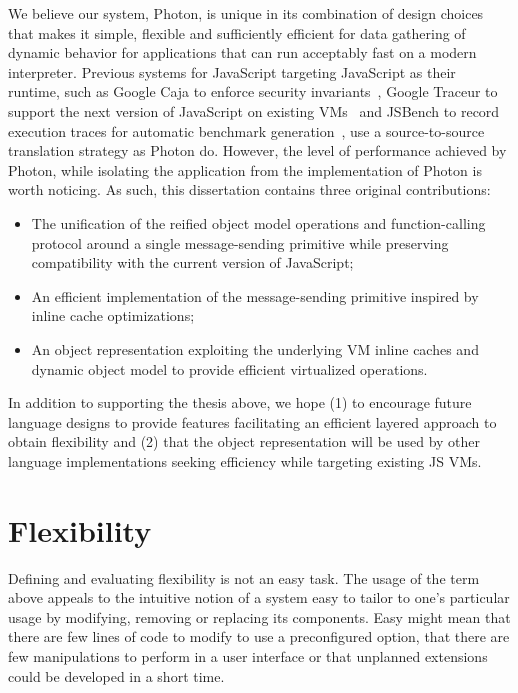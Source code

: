 We believe our system, Photon, is unique in its combination of design choices
that makes it simple, flexible and sufficiently efficient for data gathering of
dynamic behavior for applications that can run acceptably fast on a modern
interpreter.  Previous systems for JavaScript targeting JavaScript as their
runtime, such as Google Caja to enforce security invariants~\cite{Caja:2012},
Google Traceur to support the next version of JavaScript on existing
VMs~\cite{Traceur:2012} and JSBench to record execution traces for automatic
benchmark generation~\cite{Richards:2011}, use a source-to-source translation
strategy as Photon do. However, the level of performance achieved by Photon,
while isolating the application from the implementation of Photon is worth
noticing.  As such, this dissertation contains three original contributions:
\begin{itemize}
    \item The unification of the reified object model operations and
        function-calling protocol around a single message-sending primitive
        while preserving compatibility with the current version of JavaScript;
    \item An efficient implementation of the message-sending primitive inspired
          by inline cache optimizations;
    \item An object representation exploiting the underlying VM inline caches
          and dynamic object model to provide efficient virtualized operations.
\end{itemize}

In addition to supporting the thesis above, we hope (1) to encourage future
language designs to provide features facilitating an efficient layered approach
to obtain flexibility and (2) that the object representation will be used by other
language implementations seeking efficiency while targeting existing JS VMs.


\section{Flexibility}

Defining and evaluating flexibility is not an easy task. The usage of the term
above appeals to the intuitive notion of a system easy to tailor to one's
particular usage by modifying, removing or replacing its components. Easy might
mean that there are few lines of code to modify to use a preconfigured option,
that there are few manipulations to perform in a user interface or that unplanned
extensions could be developed in a short time.

